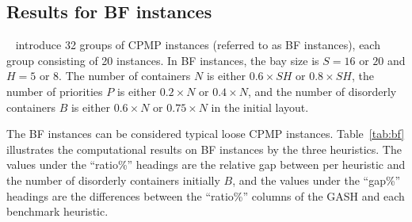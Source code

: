 \documentclass[review,3p,times,12pt,number]{elsarticle}\usepackage{amsmath}\usepackage{amssymb}
\renewcommand{\citet}[1]{\citeauthor{#1}~\citep{#1}}
\begin{document}
\subsection{Results for BF instances}

\citet{bort2012} introduce 32 groups of CPMP instances (referred to as BF instances), each group consisting of 20 instances. In BF instances, the bay size is $S=16$ or $20$ and $H=5$ or $8$. The number of containers $N$ is either $0.6\times SH$ or $0.8\times SH$, the number of priorities $P$ is either $0.2\times N$ or $0.4\times N$, and the number of disorderly containers  $B$ is either $0.6\times N$ or $0.75\times N$ in the initial layout.

The BF instances can be considered typical loose CPMP instances. Table~\ref{tab:bf} illustrates the computational results on BF instances by the three heuristics. The values under the ``ratio\%'' headings are the relative gap between per heuristic and the number of disorderly containers initially $B$, and the values under the ``gap\%'' headings are the differences between the ``ratio\%'' columns of the GASH and each benchmark heuristic. 
\end{document}
